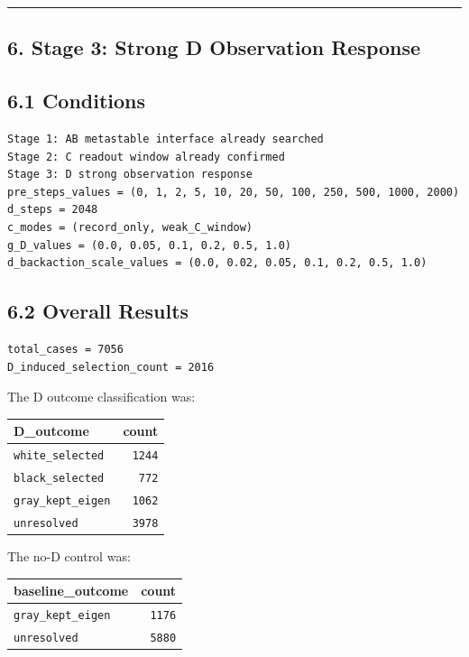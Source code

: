 \documentclass{article}
\newcounter{none}
\begin{document}
\begin{center}\rule{0.5\linewidth}{0.5pt}\end{center}

\subsection{6. Stage 3: Strong D Observation
Response}\label{stage-3-strong-d-observation-response}

\subsection{6.1 Conditions}\label{conditions-2}

\begin{verbatim}
Stage 1: AB metastable interface already searched
Stage 2: C readout window already confirmed
Stage 3: D strong observation response
pre_steps_values = (0, 1, 2, 5, 10, 20, 50, 100, 250, 500, 1000, 2000)
d_steps = 2048
c_modes = (record_only, weak_C_window)
g_D_values = (0.0, 0.05, 0.1, 0.2, 0.5, 1.0)
d_backaction_scale_values = (0.0, 0.02, 0.05, 0.1, 0.2, 0.5, 1.0)
\end{verbatim}

\subsection{6.2 Overall Results}\label{overall-results}

\begin{verbatim}
total_cases = 7056
D_induced_selection_count = 2016
\end{verbatim}

The D outcome classification was:

{\def\LTcaptype{none} %
\begin{longtable}[]{@{}lr@{}}
\toprule\noalign{}
D\_outcome & count \\
\midrule\noalign{}
\endhead
\bottomrule\noalign{}
\endlastfoot
\texttt{white\_selected} & \texttt{1244} \\
\texttt{black\_selected} & \texttt{772} \\
\texttt{gray\_kept\_eigen} & \texttt{1062} \\
\texttt{unresolved} & \texttt{3978} \\
\end{longtable}
}

The no-D control was:

{\def\LTcaptype{none} %
\begin{longtable}[]{@{}lr@{}}
\toprule\noalign{}
baseline\_outcome & count \\
\midrule\noalign{}
\endhead
\bottomrule\noalign{}
\endlastfoot
\texttt{gray\_kept\_eigen} & \texttt{1176} \\
\texttt{unresolved} & \texttt{5880} \\
\end{longtable}
}
\end{document}
